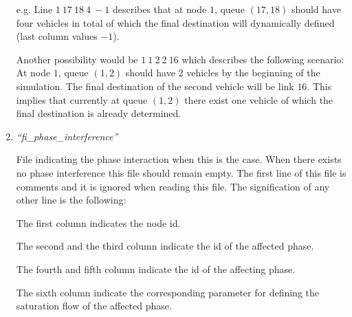 \documentclass[10pt, conference, compsocconf]{IEEEtran}
\begin{document}
\begin{enumerate}
e.g. Line $1	\ 17	\ 18	\ 4	\ -1$	 describes that at node $1$, queue $(17,18)$ should have four vehicles in total of which the final destination will dynamically defined (last column values $-1$).

Another possibility would be $1\	1	\ 2	\ 2	\ 16 $ which describes the following scenario:
At node $1$, queue $(1,2)$ should have $2$ vehicles by the beginning of the simulation. The final destination of the second vehicle will be link $16$.
This implies that currently at queue $(1,2)$ there exist one vehicle of which the final destination is already determined. 



\item \emph{``fi\_phase\_interference''}

File indicating the phase interaction  when this is the case.
When  there exists no phase interference this file should remain empty.
The first line of this file is comments and it is ignored when reading this file. 
The signification of any other line is the following:


The first column indicates the node id. 

The second and the third column indicate the id of the affected phase.

The  fourth and fifth column indicate the id of the affecting phase. 

The sixth column indicate the corresponding parameter for defining the saturation flow of the affected phase. 
 
\end{enumerate}








\end{document}
